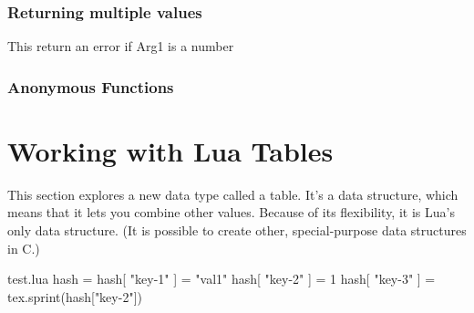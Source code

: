 \begin{tcblisting}{}
\end{tcblisting}


\subsection{Returning multiple values}

This return an error if Arg1 is a number
\begin{tcblisting}{}
\end{tcblisting}


\begin{tcblisting}{}
\end{tcblisting}

\subsection{Anonymous Functions}
\begin{tcblisting}{}
\end{tcblisting}

\chapter{Working with Lua Tables}

This section explores a new data type called a table. It's a data structure, which means that it lets
you combine other values. Because of its flexibility, it is Lua’s only data structure. (It is possible to
create other, special-purpose data structures in C.)
\begin{tcblisting}{}
\begin{filecontents*}{test.lua}
hash = {}
hash[ "key-1" ] = "val1"
hash[ "key-2" ] = 1
hash[ "key-3" ] = {}
tex.sprint(hash["key-2"])
\end{filecontents*}
\end{tcblisting}


